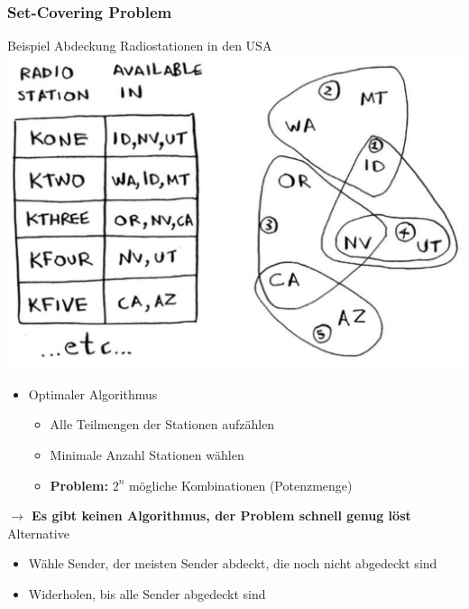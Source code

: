 \documentclass[a4paper, landscape, 8pt]{scrartcl}
\begin{document}
\begin{multicols*}{4}
                \subsubsection{Set-Covering Problem}
                    \textcolor{subsectioncolor}{Beispiel Abdeckung Radiostationen in den USA}
                    \includegraphics[scale=0.15]{graphic/08_set_covering_radio_stations}
                    \begin{itemize}
                        \item Optimaler Algorithmus
                        \begin{itemize}
                            \item Alle Teilmengen der Stationen aufzählen
                            \item Minimale Anzahl Stationen wählen
                            \item {\bfseries Problem:} $2^n$ mögliche Kombinationen (Potenzmenge)
                        \end{itemize}
                    \end{itemize}
                    {\bfseries $\to$ Es gibt keinen Algorithmus, der Problem schnell genug löst}
                    \newline
                    \textcolor{subsectioncolor}{Alternative}
                    \begin{itemize}
                        \item Wähle Sender, der meisten Sender abdeckt, die noch nicht abgedeckt sind
                        \item Widerholen, bis alle Sender abgedeckt sind
                    \end{itemize}

\end{multicols*}
\end{document}
